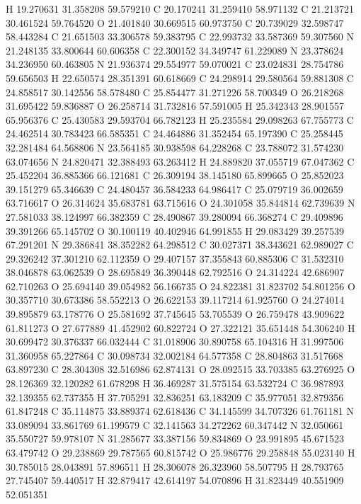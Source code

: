 \documentclass{article}
\begin{document}
H 19.270631 31.358208 59.579210
C 20.170241 31.259410 58.971132
C 21.213721 30.461524 59.764520
O 21.401840 30.669515 60.973750
C 20.739029 32.598747 58.443284
C 21.651503 33.306578 59.383795
C 22.993732 33.587369 59.307560
N 21.248135 33.800644 60.606358
C 22.300152 34.349747 61.229089
N 23.378624 34.236950 60.463805
N 21.936374 29.554977 59.070021
C 23.024831 28.754786 59.656503
H 22.650574 28.351391 60.618669
C 24.298914 29.580564 59.881308
C 24.858517 30.142556 58.578480
C 25.854477 31.271226 58.700349
O 26.218268 31.695422 59.836887
O 26.258714 31.732816 57.591005
H 25.342343 28.901557 65.956376
C 25.430583 29.593704 66.782123
H 25.235584 29.098263 67.755773
C 24.462514 30.783423 66.585351
C 24.464886 31.352454 65.197390
C 25.258445 32.281484 64.568806
N 23.564185 30.938598 64.228268
C 23.788072 31.574230 63.074656
N 24.820471 32.388493 63.263412
H 24.889820 37.055719 67.047362
C 25.452204 36.885366 66.121681
C 26.309194 38.145180 65.899665
O 25.852023 39.151279 65.346639
C 24.480457 36.584233 64.986417
C 25.079719 36.002659 63.716617
O 26.314624 35.683781 63.715616
O 24.301058 35.844814 62.739639
N 27.581033 38.124997 66.382359
C 28.490867 39.280094 66.368274
C 29.409896 39.391266 65.145702
O 30.100119 40.402946 64.991855
H 29.083429 39.257539 67.291201
N 29.386841 38.352282 64.298512
C 30.027371 38.343621 62.989027
C 29.326242 37.301210 62.112359
O 29.407157 37.355843 60.885306
C 31.532310 38.046878 63.062539
O 28.695849 36.390448 62.792516
O 24.314224 42.686907 62.710263
O 25.694140 39.054982 56.166735
O 24.822381 31.823702 54.801256
O 30.357710 30.673386 58.552213
O 26.622153 39.117214 61.925760
O 24.274014 39.895879 63.178776
O 25.581692 37.745645 53.705539
O 26.759478 43.909622 61.811273
O 27.677889 41.452902 60.822724
O 27.322121 35.651448 54.306240
H 30.699472 30.376337 66.032444
C 31.018906 30.890758 65.104316
H 31.997506 31.360958 65.227864
C 30.098734 32.002184 64.577358
C 28.804863 31.517668 63.897230
C 28.304308 32.516986 62.874131
O 28.092515 33.703385 63.276925
O 28.126369 32.120282 61.678298
H 36.469287 31.575154 63.532724
C 36.987893 32.139355 62.737355
H 37.705291 32.836251 63.183209
C 35.977051 32.879356 61.847248
C 35.114875 33.889374 62.618436
C 34.145599 34.707326 61.761181
N 33.089094 33.861769 61.199579
C 32.141563 34.272262 60.347442
N 32.050661 35.550727 59.978107
N 31.285677 33.387156 59.834869
O 23.991895 45.671523 63.479742
O 29.238869 29.787565 60.815742
O 25.986776 29.258848 55.023140
H 30.785015 28.043891 57.896511
H 28.306078 26.323960 58.507795
H 28.793765 27.745407 59.440517
H 32.879417 42.614197 54.070896
H 31.823449 40.551909 52.051351
\end{document}
